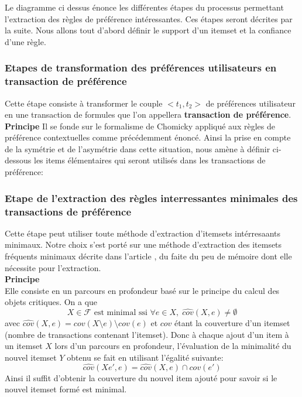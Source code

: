 \documentclass[a4paper,12pt,openany,oneside]{article}
\begin{document}
     \noindent Le diagramme ci dessus énonce les différentes étapes du processus permettant l'extraction des règles de préférence intéressantes. Ces étapes seront décrites par la suite. Nous allons tout d'abord définir le support d'un itemset et la confiance d'une règle.
     
    
     
    \subsubsection{Etapes de transformation des préférences utilisateurs en transaction de préférence}
    
       Cette étape consiste à transformer le couple $<t_{1},t_{2}>$ de préférences utilisateur en une transaction de formules que l'on appellera \textbf{transaction de préférence}.\\ 
       \textbf{Principe}
       Il se fonde sur le formalisme de Chomicky appliqué aux règles de préférence contextuelles comme précédemment énoncé. Ainsi la prise en compte de la symétrie et de l'asymétrie dans cette situation, nous amène à définir ci-dessous les items élémentaires qui seront utilisés dans les transactions de préférence:\\
 
	
  
 	 
      \subsubsection{Etape de l'extraction des règles interressantes minimales des transactions de préférence}
 	Cette étape peut utiliser toute méthode d'extraction d'itemsets intérresaants minimaux. Notre choix s'est porté sur une méthode d'extraction des itemsets fréquents minimaux décrite dans l'article \cite{SOUL}, du faite du peu de mémoire dont elle nécessite pour l'extraction.\\
 	\textbf{Principe}\\
 	Elle consiste en un parcours en profondeur basé sur le principe du calcul des objets critiques. On a que
 	\[
 		X\in \mathcal{F}\text{ est minimal ssi }\forall e \in X,\; \widehat{cov}(X,e)\neq \emptyset
 	\]
 	avec $\widehat{cov}(X,e)=cov(X\setminus e)\setminus cov(e)$ et $cov$ étant la couverture d'un itemset (nombre de transactions contenant l'itemset). Donc à chaque ajout d'un item à un itemset $X$ lors d'un parcours en profondeur, l'évaluation de la minimalité du nouvel itemset $Y$ obtenu se fait en utilisant l'égalité suivante:
 	\[
 		 	\widehat{cov}(Xe',e)=\widehat{cov}(X,e)\cap cov(e')
 	\]
 	Ainsi il suffit d'obtenir la couverture du nouvel item ajouté pour savoir si le nouvel itemset formé est minimal.
 	
\end{document}
